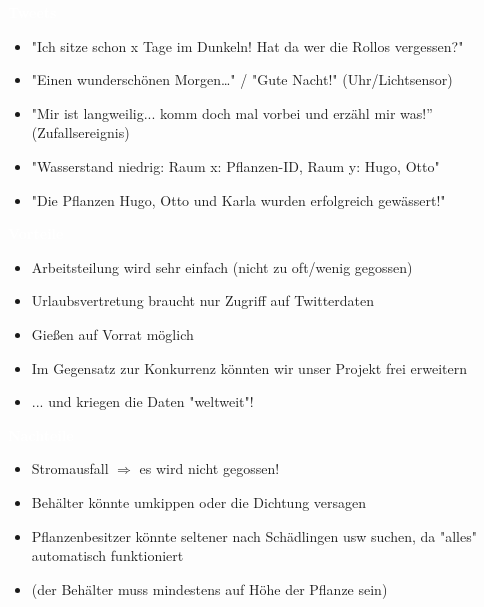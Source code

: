 \documentclass[bigger]{beamer}
\newcommand{\topic}[1]{{\huge{\textcolor{white}{\textbf{#1}}}}}
\begin{document}
\begin{frame}{\topic{Tweets}}
	\begin{itemize}
		\item "Ich sitze schon x Tage im Dunkeln! Hat da wer die Rollos vergessen?"
		\item "Einen wunderschönen Morgen…" / "Gute Nacht!" (Uhr/Lichtsensor)
		\item "Mir ist langweilig... komm doch mal vorbei und erzähl mir was!” (Zufallsereignis)
		\item "Wasserstand niedrig: Raum x: Pflanzen-ID, Raum y: Hugo, Otto"
		\item "Die Pflanzen Hugo, Otto und Karla wurden erfolgreich gewässert!"
	\end{itemize}
\end{frame}


\begin{frame}{\topic{Vorteile}}
	\begin{itemize}
		\item Arbeitsteilung wird sehr einfach (nicht zu oft/wenig gegossen)
		\item Urlaubsvertretung braucht nur Zugriff auf Twitterdaten
		\item Gießen auf Vorrat möglich
		\item Im Gegensatz zur Konkurrenz könnten wir unser Projekt frei erweitern
		\item ... und kriegen die Daten "weltweit"!
	\end{itemize}
\end{frame}


\begin{frame}{\topic{Nachteile}}
	\begin{itemize}
		\item Stromausfall $\Rightarrow$ es wird nicht gegossen!
		\item Behälter könnte umkippen oder die Dichtung versagen
		\item Pflanzenbesitzer könnte seltener nach Schädlingen usw suchen, da "alles" automatisch funktioniert
		\item (der Behälter muss mindestens auf Höhe der Pflanze sein)
	\end{itemize}
\end{frame}
\end{document}
